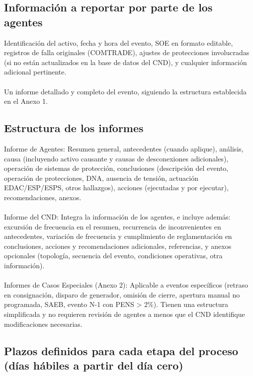 \documentclass[a5paper]{book}%
\begin{document}
\subsection{Información a reportar por parte de los agentes}

 Identificación del activo, fecha y hora del evento, \ac{SOE} en formato editable, registros de falla originales (COMTRADE), ajustes de protecciones involucradas (si no están actualizados en la base de datos del CND), y cualquier información adicional pertinente.\\\\
Un informe detallado y completo del evento, siguiendo la estructura establecida en el Anexo 1.

\subsection{Estructura de los informes}

    Informe de Agentes: Resumen general, antecedentes (cuando aplique), análisis, causa (incluyendo activo causante y causas de desconexiones adicionales), operación de sistemas de protección, conclusiones (descripción del evento, operación de protecciones, DNA, ausencia de tensión, actuación EDAC/ESP/ESPS, otros hallazgos), acciones (ejecutadas y por ejecutar), recomendaciones, anexos.\\\\
    Informe del CND: Integra la información de los agentes, e incluye además: excursión de frecuencia en el resumen, recurrencia de inconvenientes en antecedentes, variación de frecuencia y cumplimiento de reglamentación en conclusiones, acciones y recomendaciones adicionales, referencias, y anexos opcionales (topología, secuencia del evento, condiciones operativas, otra información).\\\\
    Informes de Casos Especiales (Anexo 2): Aplicable a eventos específicos (retraso en consignación, disparo de generador, omisión de cierre, apertura manual no programada, SAEB, evento N-1 con PENS > 2\%). Tienen una estructura simplificada y no requieren revisión de agentes a menos que el CND identifique modificaciones necesarias.

\subsection{Plazos definidos para cada etapa del proceso (días hábiles a partir del día cero)}
\end{document}
